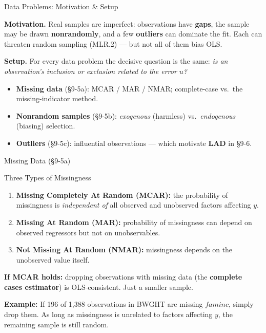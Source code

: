 \documentclass[aspectratio=169, 12pt]{beamer}
\begin{document}
\begin{frame}{Data Problems: Motivation \& Setup}

  \begin{highlightbox}
    \textbf{Motivation.} Real samples are imperfect: observations have \textbf{gaps},
    the sample may be drawn \textbf{nonrandomly}, and a few \textbf{outliers} can
    dominate the fit. Each can threaten random sampling (MLR.2) --- but not all of
    them bias OLS.
  \end{highlightbox}

  \begin{keybox}
    \textbf{Setup.} For every data problem the decisive question is the same:
    \emph{is an observation's inclusion or exclusion related to the error $u$?}
    \begin{itemize}\setlength{\itemsep}{1pt}
      \item \textbf{Missing data} (§9-5a): MCAR / MAR / NMAR; complete-case vs.\ the
        missing-indicator method.
      \item \textbf{Nonrandom samples} (§9-5b): \emph{exogenous} (harmless) vs.\
        \emph{endogenous} (biasing) selection.
      \item \textbf{Outliers} (§9-5c): influential observations --- which motivate
        \textbf{LAD} in §9-6.
    \end{itemize}
  \end{keybox}

\end{frame}

\begin{frame}[shrink=15]{Missing Data (\S9-5a)}

  \begin{definitionbox}{Three Types of Missingness}
    \begin{enumerate}\setlength{\itemsep}{2pt}
      \item \textbf{Missing Completely At Random (MCAR):} the probability of missingness is
      \emph{independent of} all observed and unobserved factors affecting $y$.

      \item \textbf{Missing At Random (MAR):} probability of missingness can depend on
      observed regressors but not on unobservables.

      \item \textbf{Not Missing At Random (NMAR):} missingness depends on the unobserved
      value itself.
    \end{enumerate}
  \end{definitionbox}

  \begin{highlightbox}
    \textbf{If MCAR holds:} dropping observations with missing data (the
    \textbf{complete cases estimator}) is OLS-consistent. Just a smaller sample.
  \end{highlightbox}

  \textbf{Example:} If 196 of 1{,}388 observations in BWGHT are missing $\mathit{faminc}$, simply drop
  them. As long as missingness is unrelated to factors affecting $y$, the remaining sample
  is still random.

\end{frame}
\end{document}
